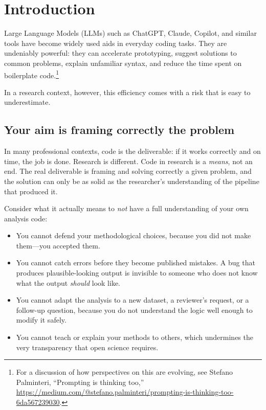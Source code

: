 \documentclass[12pt]{article}
\begin{document}
\section{Introduction}

Large Language Models (LLMs) such as ChatGPT, Claude, Copilot, and similar tools have become widely used aids in everyday coding tasks.
They are undeniably powerful: they can accelerate prototyping, suggest solutions to common problems, explain unfamiliar syntax, and reduce the time spent on boilerplate code.\footnote{For a discussion of how perspectives on this are evolving, see Stefano Palminteri, ``Prompting is thinking too,'' \url{https://medium.com/@stefano.palminteri/prompting-is-thinking-too-6da567239030}.}

In a research context, however, this efficiency comes with a risk that is easy to underestimate.

\subsection*{Your aim is framing correctly the problem}

In many professional contexts, code is the deliverable: if it works correctly and on time, the job is done.
Research is different. Code in research is a \emph{means}, not an end.
The real deliverable is framing and solving correctly a given problem, and the solution can only be as solid as the researcher's understanding of the pipeline that produced it.

Consider what it actually means to \emph{not} have a full understanding of your own analysis code:

\begin{itemize}
    \item You cannot defend your methodological choices, because you did not make them---you accepted them.
    \item You cannot catch errors before they become published mistakes. A bug that produces plausible-looking output is invisible to someone who does not know what the output \emph{should} look like.
    \item You cannot adapt the analysis to a new dataset, a reviewer's request, or a follow-up question, because you do not understand the logic well enough to modify it safely.
    \item You cannot teach or explain your methods to others, which undermines the very transparency that open science requires.
\end{itemize}
\end{document}
